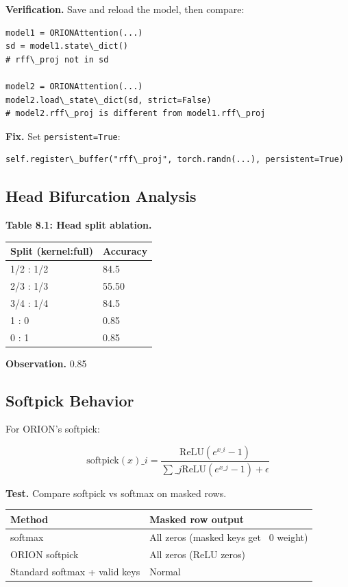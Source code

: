 \textbf{Verification.} Save and reload the model, then compare:

\begin{lstlisting}
model1 = ORIONAttention(...)
sd = model1.state\_dict()
# rff\_proj not in sd

model2 = ORIONAttention(...)
model2.load\_state\_dict(sd, strict=False)
# model2.rff\_proj is different from model1.rff\_proj
\end{lstlisting}

\textbf{Fix.} Set \texttt{persistent=True}:

\begin{lstlisting}
self.register\_buffer("rff\_proj", torch.randn(...), persistent=True)
\end{lstlisting}

\subsection{Head Bifurcation Analysis}

\textbf{Table 8.1: Head split ablation.}

\begin{table}[H]
\centering
\small
\begin{tabular}{ll}
\toprule
\textbf{Split (kernel:full)} & \textbf{Accuracy} \\
\midrule
1/2 : 1/2 & 84.5 \\
2/3 : 1/3 & 55.50 \\
3/4 : 1/4 & 84.5 \\
1 : 0 & 0.85 \\
0 : 1 & 0.85 \\
\bottomrule
\end{tabular}
\end{table}

\textbf{Observation.} 0.85

\subsection{Softpick Behavior}

For ORION's softpick:

\[
\text{softpick}(x)\_i = \frac{\text{ReLU}(e^{x\_i} - 1)}{\sum\_j \text{ReLU}(e^{x\_j} - 1) + \epsilon}
\]

\textbf{Test.} Compare softpick vs softmax on masked rows.

\begin{table}[H]
\centering
\small
\begin{tabular}{ll}
\toprule
\textbf{Method} & \textbf{Masked row output} \\
\midrule
softmax & All zeros (masked keys get ~0 weight) \\
ORION softpick & All zeros (ReLU zeros) \\
Standard softmax + valid keys & Normal \\
\bottomrule
\end{tabular}
\end{table}

